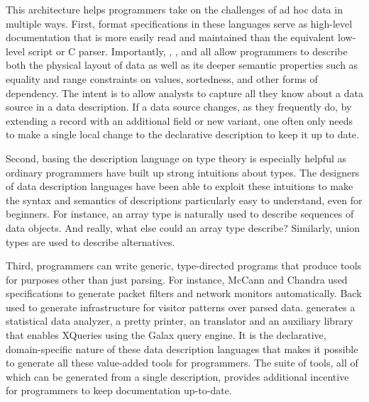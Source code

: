 This architecture helps programmers take on the
challenges of ad hoc data in multiple ways.
First, format specifications in these languages serve as high-level
documentation that is more easily read and
maintained than the equivalent low-level \perl{} script or C parser.
Importantly, \datascript{}, \packettypes, and \pads{} all
allow programmers to describe both the physical layout of data
as well as its deeper semantic properties such as equality and range 
constraints on values, sortedness, and other forms of dependency.
The intent is to allow analysts to capture all they know about
a data source in a data description.  If a data source changes,
as they frequently do, by extending a record with an additional field or new
variant, one often only needs to make a single local change to
the declarative description to keep it up to date.  

Second, basing the description language on type theory is especially helpful as
ordinary programmers have built up strong intuitions about types.  
The designers of data description languages
have been able to exploit these intuitions to make the syntax and
semantics of descriptions
particularly easy to understand, even for beginners.  For instance,
an array type is naturally used to describe sequences of data objects.
And really, what else could an array type describe?  Similarly,
union types are used to describe alternatives.

Third, programmers can write generic, type-directed programs that 
produce tools for purposes other than just parsing.  For instance,
McCann and Chandra used \packettypes{} specifications to generate
packet filters and network monitors automatically.
Back used \datascript{} to generate infrastructure for 
visitor patterns over parsed data. \pads{} generates
a statistical data analyzer, a pretty
printer, an \xml{} translator and an auxiliary library
that enables XQueries using the Galax query engine\cite{galax}.
It is the declarative, domain-specific nature of these data description
languages that makes it possible to generate all these value-added
tools for programmers.  The suite of tools, all of which can be generated
from a single description, provides additional incentive for
programmers to keep documentation up-to-date.


